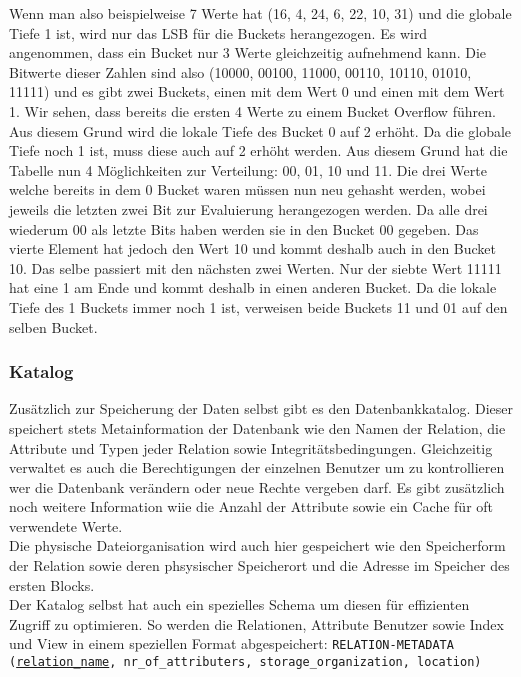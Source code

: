 \documentclass{article}
\begin{document}
	Wenn man also beispielweise 7 Werte hat (16, 4, 24, 6, 22, 10, 31) und die globale Tiefe 1 ist, wird nur das LSB für die Buckets herangezogen. Es wird angenommen, dass ein Bucket nur 3 Werte gleichzeitig aufnehmend kann. Die Bitwerte dieser Zahlen sind also (10000, 00100, 11000, 00110, 10110, 01010, 11111) und es gibt zwei Buckets, einen mit dem Wert 0 und einen mit dem Wert 1. Wir sehen, dass bereits die ersten 4 Werte zu einem Bucket Overflow führen. Aus diesem Grund wird die lokale Tiefe des Bucket 0 auf 2 erhöht. Da die globale Tiefe noch 1 ist, muss diese auch auf 2 erhöht werden. Aus diesem Grund hat die Tabelle nun 4 Möglichkeiten zur Verteilung: 00, 01, 10 und 11. Die drei Werte welche bereits in dem 0 Bucket waren müssen nun neu gehasht werden, wobei jeweils die letzten zwei Bit zur Evaluierung herangezogen werden. Da alle drei wiederum 00 als letzte Bits haben werden sie in den Bucket 00 gegeben. Das vierte Element hat jedoch den Wert 10 und kommt deshalb auch in den Bucket 10. Das selbe passiert mit den nächsten zwei Werten. Nur der siebte Wert 11111 hat eine 1 am Ende und kommt deshalb in einen anderen Bucket. Da die lokale Tiefe des 1 Buckets immer noch 1 ist, verweisen beide Buckets 11 und 01 auf den selben Bucket.
	\subsubsection{Katalog}
	Zusätzlich zur Speicherung der Daten selbst gibt es den Datenbankkatalog. Dieser speichert stets Metainformation der Datenbank wie den Namen der Relation, die Attribute und Typen jeder Relation sowie Integritätsbedingungen. Gleichzeitig verwaltet es auch die Berechtigungen der einzelnen Benutzer um zu kontrollieren wer die Datenbank verändern oder neue Rechte vergeben darf. Es gibt zusätzlich noch weitere Information wiie die Anzahl der Attribute sowie ein Cache für oft verwendete Werte. \\
	Die physische Dateiorganisation wird auch hier gespeichert wie den Speicherform der Relation sowie deren phsysischer Speicherort und die Adresse im Speicher des ersten Blocks. \\
	Der Katalog selbst hat auch ein spezielles Schema um diesen für effizienten Zugriff zu optimieren. So werden die Relationen, Attribute Benutzer sowie Index und View in einem speziellen Format abgespeichert: \texttt{RELATION-METADATA (\underline{relation\_name}, nr\_of\_attributers, storage\_organization, location)}
\end{document}

